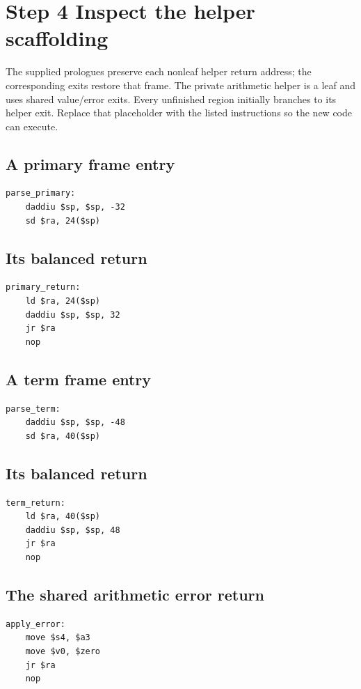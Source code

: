 \section{Step 4 Inspect the helper scaffolding}\label{expression-s04}

The supplied prologues preserve each nonleaf helper return address; the corresponding exits restore that frame. The private arithmetic helper is a leaf and uses shared value/error exits. Every unfinished region initially branches to its helper exit. Replace that placeholder with the listed instructions so the new code can execute.

\subsection{A primary frame entry}
\begin{verbatim}
parse_primary:
    daddiu $sp, $sp, -32
    sd $ra, 24($sp)
\end{verbatim}
\subsection{Its balanced return}
\begin{verbatim}
primary_return:
    ld $ra, 24($sp)
    daddiu $sp, $sp, 32
    jr $ra
    nop
\end{verbatim}
\subsection{A term frame entry}
\begin{verbatim}
parse_term:
    daddiu $sp, $sp, -48
    sd $ra, 40($sp)
\end{verbatim}
\subsection{Its balanced return}
\begin{verbatim}
term_return:
    ld $ra, 40($sp)
    daddiu $sp, $sp, 48
    jr $ra
    nop
\end{verbatim}
\subsection{The shared arithmetic error return}
\begin{verbatim}
apply_error:
    move $s4, $a3
    move $v0, $zero
    jr $ra
    nop
\end{verbatim}
